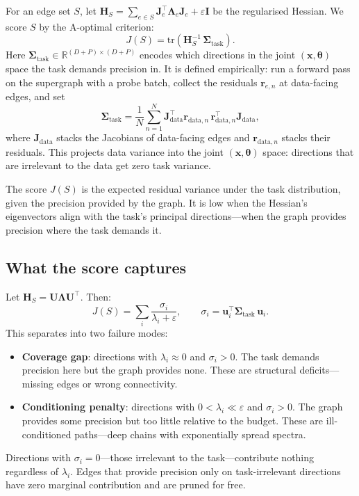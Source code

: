 \documentclass[11pt, a4paper]{article}
\newcommand{\R}{\mathbb{R}}
\newcommand{\bx}{\bm{x}}
\newcommand{\btheta}{\bm{\theta}}
\begin{document}
For an edge set $S$, let $\bm{H}_S = \sum_{e \in S}\bm{J}_e^\top\bm{\Lambda}_e\bm{J}_e + \varepsilon\bm{I}$ be the regularised Hessian.
We score $S$ by the A-optimal criterion:
\begin{equation}\label{eq:score}
    J(S) = \mathrm{tr}\!\left(\bm{H}_S^{-1}\,\bm{\Sigma}_{\mathrm{task}}\right).
\end{equation}
Here $\bm{\Sigma}_{\mathrm{task}} \in \R^{(D+P)\times(D+P)}$ encodes which directions in the joint $(\bx,\btheta)$ space the task demands precision in.
It is defined empirically: run a forward pass on the supergraph with a probe batch, collect the residuals $\bm{r}_{e,n}$ at data-facing edges, and set
\begin{equation}\label{eq:sigma}
    \bm{\Sigma}_{\mathrm{task}} = \frac{1}{N}\sum_{n=1}^N \bm{J}_{\mathrm{data}}^\top\bm{r}_{\mathrm{data},n}\,\bm{r}_{\mathrm{data},n}^\top\bm{J}_{\mathrm{data}},
\end{equation}
where $\bm{J}_{\mathrm{data}}$ stacks the Jacobians of data-facing edges and $\bm{r}_{\mathrm{data},n}$ stacks their residuals.
This projects data variance into the joint $(\bx,\btheta)$ space: directions that are irrelevant to the data get zero task variance.

The score $J(S)$ is the expected residual variance under the task distribution, given the precision provided by the graph.
It is low when the Hessian's eigenvectors align with the task's principal directions---when the graph provides precision where the task demands it.

\subsection{What the score captures}

Let $\bm{H}_S = \bm{U\Lambda U}^\top$.
Then:
\begin{equation}\label{eq:decomp}
    J(S) = \sum_i \frac{\sigma_i}{\lambda_i + \varepsilon}, \qquad \sigma_i = \bm{u}_i^\top\bm{\Sigma}_{\mathrm{task}}\,\bm{u}_i.
\end{equation}
This separates into two failure modes:
\begin{itemize}
    \item \textbf{Coverage gap}: directions with $\lambda_i \approx 0$ and $\sigma_i > 0$.
    The task demands precision here but the graph provides none.
    These are structural deficits---missing edges or wrong connectivity.
    \item \textbf{Conditioning penalty}: directions with $0 < \lambda_i \ll \varepsilon$ and $\sigma_i > 0$.
    The graph provides some precision but too little relative to the budget.
    These are ill-conditioned paths---deep chains with exponentially spread spectra.
\end{itemize}
Directions with $\sigma_i = 0$---those irrelevant to the task---contribute nothing regardless of $\lambda_i$.
Edges that provide precision only on task-irrelevant directions have zero marginal contribution and are pruned for free.
\end{document}
